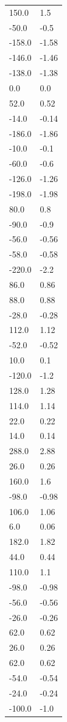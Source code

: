 \begin{longtable}{ll}
150.0 & 1.5 \\
-50.0 & -0.5 \\
-158.0 & -1.58 \\
-146.0 & -1.46 \\
-138.0 & -1.38 \\
0.0 & 0.0 \\
52.0 & 0.52 \\
-14.0 & -0.14 \\
-186.0 & -1.86 \\
-10.0 & -0.1 \\
-60.0 & -0.6 \\
-126.0 & -1.26 \\
-198.0 & -1.98 \\
80.0 & 0.8 \\
-90.0 & -0.9 \\
-56.0 & -0.56 \\
-58.0 & -0.58 \\
-220.0 & -2.2 \\
86.0 & 0.86 \\
88.0 & 0.88 \\
-28.0 & -0.28 \\
112.0 & 1.12 \\
-52.0 & -0.52 \\
10.0 & 0.1 \\
-120.0 & -1.2 \\
128.0 & 1.28 \\
114.0 & 1.14 \\
22.0 & 0.22 \\
14.0 & 0.14 \\
288.0 & 2.88 \\
26.0 & 0.26 \\
160.0 & 1.6 \\
-98.0 & -0.98 \\
106.0 & 1.06 \\
6.0 & 0.06 \\
182.0 & 1.82 \\
44.0 & 0.44 \\
110.0 & 1.1 \\
-98.0 & -0.98 \\
-56.0 & -0.56 \\
-26.0 & -0.26 \\
62.0 & 0.62 \\
26.0 & 0.26 \\
62.0 & 0.62 \\
-54.0 & -0.54 \\
-24.0 & -0.24 \\
-100.0 & -1.0 \\

\end{longtable}
